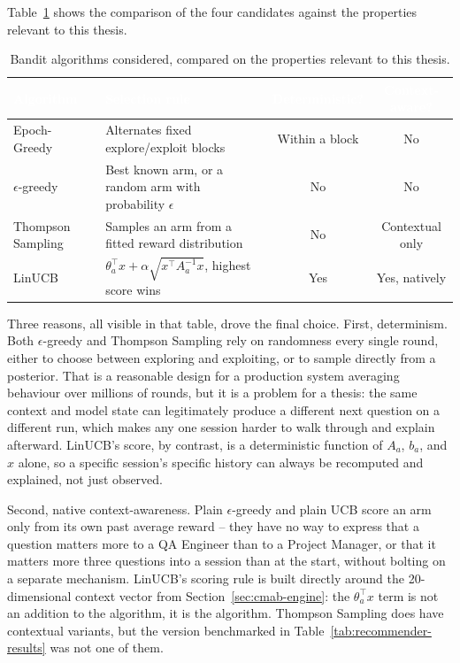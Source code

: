 \documentclass[a4paper, 12pt, oneside, openany, BCOR1cm,toc=chapterentrywithdots]{scrbook}
\newcommand{\thw}[1]{\textcolor{white}{\textbf{#1}}}
\begin{document}
Table~\ref{tab:algorithm-comparison} shows the comparison of the four candidates against the
properties relevant to this thesis.

\begin{table}[h]
\centering
{}
\begin{tabular}{l p{4.3cm} c c}
\toprule
\rowcolor{green!55!black}
\thw{Algorithm} & \thw{Selection rule} & \thw{Deterministic?} & \thw{Context-aware?} \\
\midrule
Epoch-Greedy~\cite{langford2007epochgreedy} & Alternates fixed explore/exploit
blocks & Within a block & No \\
$\epsilon$-greedy~\cite{tokic2011valuedifference} & Best known arm, or a
random arm with probability $\epsilon$ & No & No \\
Thompson Sampling~\cite{agrawal2013thompson} & Samples an arm from a fitted
reward distribution & No & Contextual only \\
LinUCB~\cite{li2010contextual,huang2016linucb} & $\theta_a^\top x + \alpha
\sqrt{x^\top A_a^{-1} x}$, highest score wins & Yes & Yes, natively \\
\bottomrule
\end{tabular}
\caption{Bandit algorithms considered, compared on the properties relevant to this thesis.}
\label{tab:algorithm-comparison}
\end{table}

Three reasons, all visible in that table, drove the final choice. First, determinism.
Both $\epsilon$-greedy and Thompson Sampling rely on randomness every single round, either to
choose between exploring and exploiting, or to sample directly from a posterior. That is a
reasonable design for a production system averaging behaviour over millions of rounds, but it is
a problem for a thesis: the same context and model state can legitimately produce a different
next question on a different run, which makes any one session harder to walk through and explain
afterward. LinUCB's score, by contrast, is a deterministic function of $A_a$, $b_a$, and $x$
alone, so a specific session's specific history can always be recomputed and explained, not just
observed.

Second, native context-awareness. Plain $\epsilon$-greedy and plain UCB score an arm
only from its own past average reward -- they have no way to express that a question matters more
to a QA Engineer than to a Project Manager, or that it matters more three questions into a
session than at the start, without bolting on a separate mechanism. LinUCB's scoring rule is
built directly around the 20-dimensional context vector from Section~\ref{sec:cmab-engine}: the
$\theta_a^\top x$ term is not an addition to the algorithm, it is the algorithm. Thompson Sampling
does have contextual variants, but the version benchmarked in Table~\ref{tab:recommender-results}
was not one of them.
\end{document}
